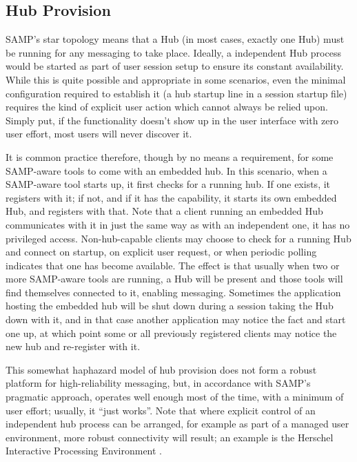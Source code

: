 \documentclass[5p]{elsarticle}
\begin{document}
\subsection{Hub Provision} \label{sec:hubProvision}

SAMP's star topology means that a Hub (in most cases, exactly one Hub)
must be running for any messaging to take place.
Ideally, a independent Hub process would be started
as part of user session setup to ensure its constant availability.
While this is quite possible and appropriate in some scenarios,
even the minimal configuration required to establish it
(a hub startup line in a session startup file)
requires the kind of explicit user action which cannot always be relied upon.
Simply put, if the functionality doesn't show up in the user interface
with zero user effort, most users will never discover it.

It is common practice therefore, though by no means a requirement,
for some SAMP-aware tools to come with an embedded hub.
In this scenario, when a SAMP-aware tool starts up, it first checks for
a running hub.
If one exists, it registers with it;
if not, and if it has the capability, it starts its own embedded Hub,
and registers with that.
Note that a client running an embedded Hub communicates with it in
just the same way as with an independent one, it has no privileged access.
Non-hub-capable clients may choose to check for a running Hub and connect
on startup, on explicit user request, or when periodic polling indicates
that one has become available.
The effect is that usually when two or more SAMP-aware tools are running,
a Hub will be present and those tools will find themselves connected to it,
enabling messaging.
Sometimes the application hosting the embedded hub will be shut down
during a session taking the Hub down with it,
and in that case another application may notice the fact and start one up,
at which point some or all previously registered clients may notice
the new hub and re-register with it.

This somewhat haphazard model of hub provision does not form a
robust platform for high-reliability messaging,
but, in accordance with SAMP's pragmatic approach,
operates well enough most of the time, with a minimum of user effort;
usually, it ``just works''.
Note that where explicit control of an independent hub process
can be arranged,
for example as part of a managed user environment,
more robust connectivity will result;
an example is the Herschel Interactive Processing Environment
\citep{2010ASPC..434..139O}.
\end{document}
